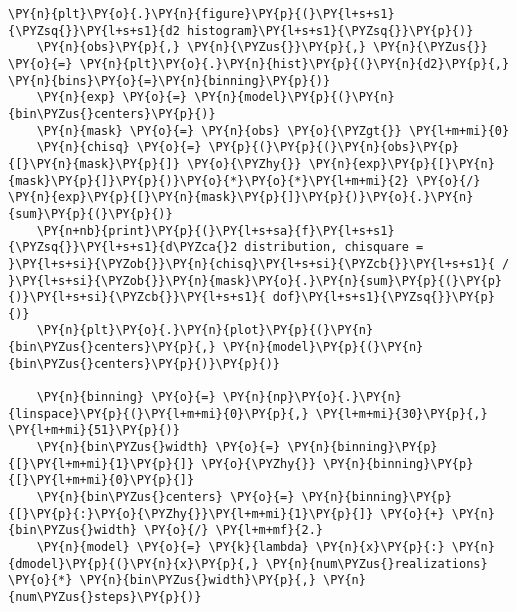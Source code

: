 \begin{Verbatim}[label=\makebox{\href{https://github.com/unipi-physics-labs/lab1-sheets/tree/main/snippy/random_walk.py}{https://github.com/.../random\_walk.py}},commandchars=\\\{\}]
    \PY{n}{plt}\PY{o}{.}\PY{n}{figure}\PY{p}{(}\PY{l+s+s1}{\PYZsq{}}\PY{l+s+s1}{d2 histogram}\PY{l+s+s1}{\PYZsq{}}\PY{p}{)}
    \PY{n}{obs}\PY{p}{,} \PY{n}{\PYZus{}}\PY{p}{,} \PY{n}{\PYZus{}} \PY{o}{=} \PY{n}{plt}\PY{o}{.}\PY{n}{hist}\PY{p}{(}\PY{n}{d2}\PY{p}{,} \PY{n}{bins}\PY{o}{=}\PY{n}{binning}\PY{p}{)}
    \PY{n}{exp} \PY{o}{=} \PY{n}{model}\PY{p}{(}\PY{n}{bin\PYZus{}centers}\PY{p}{)}
    \PY{n}{mask} \PY{o}{=} \PY{n}{obs} \PY{o}{\PYZgt{}} \PY{l+m+mi}{0}
    \PY{n}{chisq} \PY{o}{=} \PY{p}{(}\PY{p}{(}\PY{n}{obs}\PY{p}{[}\PY{n}{mask}\PY{p}{]} \PY{o}{\PYZhy{}} \PY{n}{exp}\PY{p}{[}\PY{n}{mask}\PY{p}{]}\PY{p}{)}\PY{o}{*}\PY{o}{*}\PY{l+m+mi}{2} \PY{o}{/} \PY{n}{exp}\PY{p}{[}\PY{n}{mask}\PY{p}{]}\PY{p}{)}\PY{o}{.}\PY{n}{sum}\PY{p}{(}\PY{p}{)}
    \PY{n+nb}{print}\PY{p}{(}\PY{l+s+sa}{f}\PY{l+s+s1}{\PYZsq{}}\PY{l+s+s1}{d\PYZca{}2 distribution, chisquare = }\PY{l+s+si}{\PYZob{}}\PY{n}{chisq}\PY{l+s+si}{\PYZcb{}}\PY{l+s+s1}{ / }\PY{l+s+si}{\PYZob{}}\PY{n}{mask}\PY{o}{.}\PY{n}{sum}\PY{p}{(}\PY{p}{)}\PY{l+s+si}{\PYZcb{}}\PY{l+s+s1}{ dof}\PY{l+s+s1}{\PYZsq{}}\PY{p}{)}
    \PY{n}{plt}\PY{o}{.}\PY{n}{plot}\PY{p}{(}\PY{n}{bin\PYZus{}centers}\PY{p}{,} \PY{n}{model}\PY{p}{(}\PY{n}{bin\PYZus{}centers}\PY{p}{)}\PY{p}{)}

    \PY{n}{binning} \PY{o}{=} \PY{n}{np}\PY{o}{.}\PY{n}{linspace}\PY{p}{(}\PY{l+m+mi}{0}\PY{p}{,} \PY{l+m+mi}{30}\PY{p}{,} \PY{l+m+mi}{51}\PY{p}{)}
    \PY{n}{bin\PYZus{}width} \PY{o}{=} \PY{n}{binning}\PY{p}{[}\PY{l+m+mi}{1}\PY{p}{]} \PY{o}{\PYZhy{}} \PY{n}{binning}\PY{p}{[}\PY{l+m+mi}{0}\PY{p}{]}
    \PY{n}{bin\PYZus{}centers} \PY{o}{=} \PY{n}{binning}\PY{p}{[}\PY{p}{:}\PY{o}{\PYZhy{}}\PY{l+m+mi}{1}\PY{p}{]} \PY{o}{+} \PY{n}{bin\PYZus{}width} \PY{o}{/} \PY{l+m+mf}{2.}
    \PY{n}{model} \PY{o}{=} \PY{k}{lambda} \PY{n}{x}\PY{p}{:} \PY{n}{dmodel}\PY{p}{(}\PY{n}{x}\PY{p}{,} \PY{n}{num\PYZus{}realizations} \PY{o}{*} \PY{n}{bin\PYZus{}width}\PY{p}{,} \PY{n}{num\PYZus{}steps}\PY{p}{)}


\end{Verbatim}
